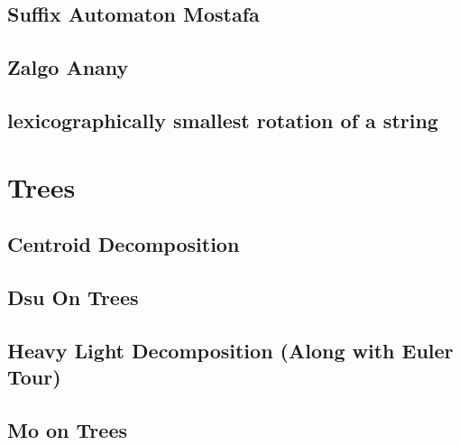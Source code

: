 \subsection{Suffix Automaton Mostafa}
\vspace{-2ex}
\raggedbottom
\vspace{-3.2ex}
\hrulefill
\subsection{Zalgo Anany}
\vspace{-2ex}
\raggedbottom
\vspace{-3.2ex}
\hrulefill
\subsection{lexicographically smallest rotation of a string}
\vspace{-2ex}
\raggedbottom
\vspace{-3.2ex}
\hrulefill

\section{Trees}
\subsection{Centroid Decomposition}
\vspace{-2ex}
\raggedbottom
\vspace{-3.2ex}
\hrulefill
\subsection{Dsu On Trees}
\vspace{-2ex}
\raggedbottom
\vspace{-3.2ex}
\hrulefill
\subsection{Heavy Light Decomposition (Along with Euler Tour)}
\vspace{-2ex}
\raggedbottom
\vspace{-3.2ex}
\hrulefill
\subsection{Mo on Trees}
\vspace{-2ex}
\raggedbottom
\vspace{-3.2ex}
\hrulefill

